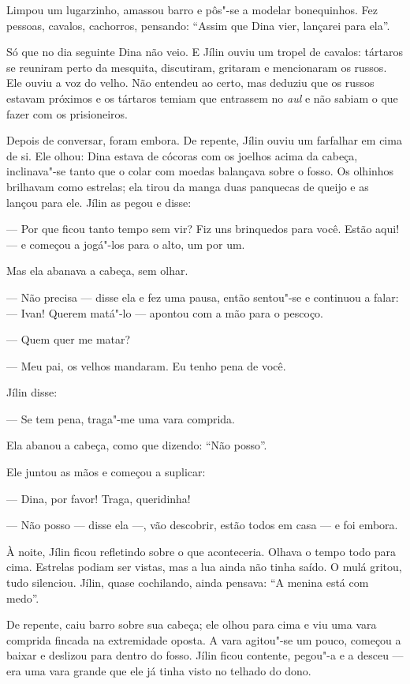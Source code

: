 Limpou um lugarzinho, amassou barro e pôs"-se a modelar bonequinhos. Fez
pessoas, cavalos, cachorros, pensando: ``Assim que Dina vier, lançarei
para ela''.

Só que no dia seguinte Dina não veio. E Jílin ouviu um tropel de
cavalos: tártaros se reuniram perto da mesquita, discutiram, gritaram e
mencionaram os russos. Ele ouviu a voz do velho. Não entendeu ao certo,
mas deduziu que os russos estavam próximos e os tártaros temiam que
entrassem no \emph{aul} e não sabiam o que fazer com os prisioneiros.

Depois de conversar, foram embora. De repente, Jílin ouviu um farfalhar em
cima de si. Ele olhou: Dina estava de cócoras com os joelhos acima da
cabeça, inclinava"-se tanto que o colar com moedas balançava sobre o
fosso. Os olhinhos brilhavam como estrelas; ela tirou da manga duas
panquecas de queijo e as lançou para ele. Jílin as pegou e disse:

--- Por que ficou tanto tempo sem vir? Fiz uns brinquedos para você.
Estão aqui! --- e começou a jogá"-los para o alto, um por um.

Mas ela abanava a cabeça, sem olhar.

--- Não precisa --- disse ela e fez uma pausa, então sentou"-se e
continuou a falar: --- Ivan! Querem matá"-lo --- apontou com a mão para o
pescoço.

--- Quem quer me matar?

--- Meu pai, os velhos mandaram. Eu tenho pena de você.

Jílin disse:

--- Se tem pena, traga"-me uma vara comprida.

Ela abanou a cabeça, como que dizendo: ``Não posso''.

Ele juntou as mãos e começou a suplicar:

--- Dina, por favor! Traga, queridinha!

--- Não posso --- disse ela ---, vão descobrir, estão todos em casa ---
e foi embora.

À noite, Jílin ficou refletindo sobre o que aconteceria. Olhava o tempo
todo para cima. Estrelas podiam ser vistas, mas a lua ainda não tinha
saído. O mulá gritou, tudo silenciou. Jílin, quase cochilando, ainda
pensava: ``A menina está com medo''.

De repente, caiu barro sobre sua cabeça; ele olhou para cima e viu uma
vara comprida fincada na extremidade oposta. A vara agitou"-se um pouco,
começou a baixar e deslizou para dentro do fosso. Jílin ficou contente,
pegou"-a e a desceu --- era uma vara grande que ele já tinha visto no
telhado do dono.

